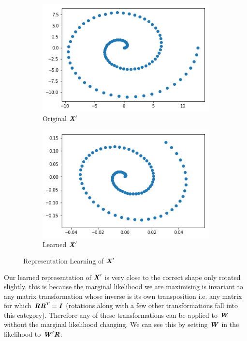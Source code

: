 \documentclass{article}
\newcommand{\mat}[1]{\textbf{\textit{#1}}}
\begin{document}
\begin{figure}[H]
	\centering
	\begin{subfigure}[t]{0.4\linewidth}
		\includegraphics[width=\linewidth]{oldX}
		\caption{Original $\mat{X}^\prime$}
		\label{fig:oldX}
	\end{subfigure}
	\begin{subfigure}[t]{0.4\linewidth}
		\includegraphics[width=\linewidth]{newX}
		\caption{Learned $\mat{X}^\prime$}
		\label{fig:newX}
	\end{subfigure}
	\caption{Representation Learning of $\mat{X}^\prime$}
\end{figure}
Our learned representation of $\mat{X}^\prime$ is very close to the correct shape only rotated slightly, this is because the marginal likelihood we are maximising is invariant to any matrix transformation whose inverse is its own transposition i.e. any matrix for which $\mat{R}\mat{R}^T = \mat{I}$ (rotations along with a few other transformations fall into this category). Therefore any of these transformations can be applied to $\mat{W}$ without the marginal likelihood changing. We can see this by setting $\mat{W}$ in the likelihood to $\mat{W}^\prime\mat{R}$:
\end{document}
